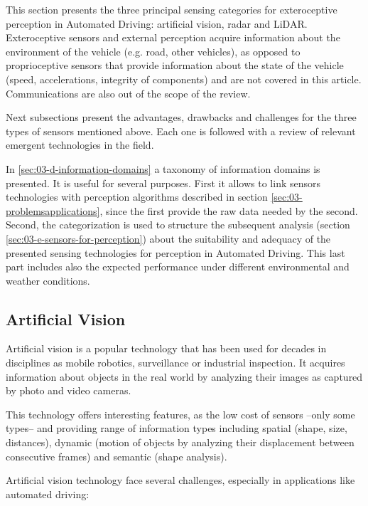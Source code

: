 
This section presents the three principal sensing categories for exteroceptive
perception in Automated Driving: artificial vision, radar and LiDAR.
Exteroceptive sensors and external perception acquire information about the
environment of the vehicle (e.g. road, other vehicles), as opposed to 
proprioceptive sensors that provide information about the state of the vehicle
(speed, accelerations, integrity of components) and are not covered in this 
article. Communications are also out of the scope of the review. 

Next subsections present the advantages, drawbacks and challenges for the three 
types of sensors mentioned above. Each one is followed with a review of
relevant emergent technologies in the field.

In \ref{sec:03-d-information-domains} a taxonomy of information domains is
presented. It is useful for several purposes. First it allows to 
link sensors technologies with perception algorithms described in section
\ref{sec:03-problemsapplications}, since the first provide the raw data needed
by the second. Second, the categorization is used to structure the subsequent
analysis (section \ref{sec:03-e-sensors-for-perception}) about the suitability
and adequacy of the presented sensing technologies for perception in Automated
Driving. This last part includes also the expected performance under different
environmental and weather conditions.

\subsection{Artificial Vision}
Artificial vision is a popular technology that has been used for decades in 
disciplines as mobile robotics, surveillance or industrial inspection. 
It acquires information about objects in the real world by analyzing their
images as captured by photo and video cameras. 

This technology offers interesting features, as the low cost of sensors --only 
some types-- and providing range of information types including spatial
(shape, size, distances), dynamic (motion of objects by analyzing their 
displacement between consecutive frames) and semantic (shape analysis).

Artificial vision technology face several challenges, especially in 
applications like automated driving:

